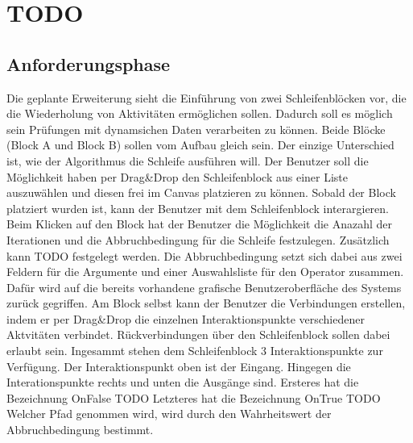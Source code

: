 \documentclass{article}
\begin{document}
    \newpage
    \section{TODO}
    \subsection{Anforderungsphase}
    Die geplante Erweiterung sieht die Einführung von zwei Schleifenblöcken vor, die die Wiederholung von Aktivitäten ermöglichen sollen. 
    Dadurch soll es möglich sein Prüfungen mit dynamsichen Daten verarbeiten zu können.
    Beide Blöcke (Block A und Block B) sollen vom Aufbau gleich sein.
    Der einzige Unterschied ist, wie der Algorithmus die Schleife ausführen will.
    Der Benutzer soll die Möglichkeit haben per Drag&Drop den Schleifenblock aus einer Liste auszuwählen und diesen frei im Canvas platzieren zu können.
    Sobald der Block platziert wurden ist, kann der Benutzer mit dem Schleifenblock interargieren.
    Beim Klicken auf den Block hat der Benutzer die Möglichkeit die Anazahl der Iterationen und die Abbruchbedingung für die Schleife festzulegen.
    Zusätzlich kann TODO festgelegt werden.
    Die Abbruchbedingung setzt sich dabei aus zwei Feldern für die Argumente und einer Auswahlsliste für den Operator zusammen.
    Dafür wird auf die bereits vorhandene grafische Benutzeroberfläche des Systems zurück gegriffen.
    Am Block selbst kann der Benutzer die Verbindungen erstellen, indem er per Drag&Drop die einzelnen Interaktionspunkte verschiedener Aktvitäten verbindet.
    Rückverbindungen über den Schleifenblock sollen dabei erlaubt sein.
    Ingesammt stehen dem Schleifenblock 3 Interaktionspunkte zur Verfügung.
    Der Interaktionspunkt oben ist der Eingang.
    Hingegen die Interationspunkte rechts und unten die Ausgänge sind.
    Ersteres hat die Bezeichnung OnFalse TODO
    Letzteres hat die Bezeichnung OnTrue TODO
    Welcher Pfad genommen wird, wird durch den Wahrheitswert der Abbruchbedingung bestimmt.
\end{document}
